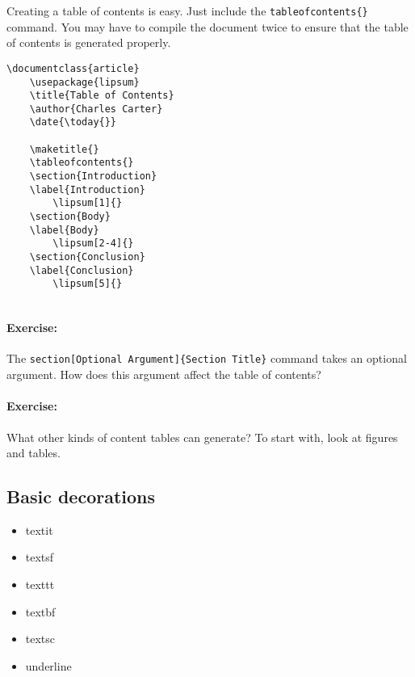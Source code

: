         Creating a table of contents is easy. Just include the \texttt{tableofcontents\{\}} command. You may have to compile the document twice to ensure that the table of contents is generated properly.
        \begin{verbatim}
\documentclass{article}
    \usepackage{lipsum}
    \title{Table of Contents}
    \author{Charles Carter}
    \date{\today{}}
 
    \maketitle{}
    \tableofcontents{}
    \section{Introduction}
    \label{Introduction}
        \lipsum[1]{}
    \section{Body}
    \label{Body}
        \lipsum[2-4]{}
    \section{Conclusion}
    \label{Conclusion}
        \lipsum[5]{}
    
        \end{verbatim}

        \paragraph{Exercise:}The \texttt{section[Optional Argument]\{Section Title\}} command takes an optional argument. How does this argument affect the table of contents?

        \paragraph{Exercise:}What other kinds of content tables can \Lx{} generate? To start with, look at figures and tables.

        \subsection{Basic decorations}
        \label{Basic decorations}
        
        \begin{cmd}
            \begin{itemize}
                \item{textit}
                \item{textsf}
                \item{texttt}
                \item{textbf}
                \item{textsc}
                \item{underline}
            \end{itemize}
        \end{cmd}

